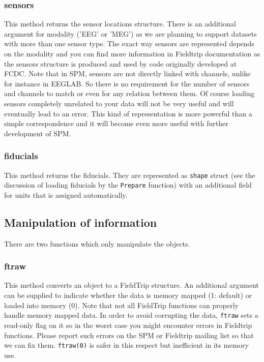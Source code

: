 \subsubsection{sensors}
This method returns the sensor locations structure. There is an additional argument for modality ('EEG' or 'MEG') as we are planning to support datasets with more than one sensor type. The exact way sensors are represented depends on the modality and you can find more information in Fieldtrip documentation as the sensors structure is produced and used by code originally developed at FCDC. Note that in SPM, sensors are not directly linked with channels, unlike for instance in EEGLAB. So there is no requirement for the number of sensors and channels to match or even for any relation between them. Of course loading sensors completely unrelated to your data will not be very useful and will eventually lead to an error. This kind of representation is more powerful than a simple correspondence and it will become even more useful with further development of SPM.

\subsubsection{fiducials}
This method returns the fiducials. They are represented as \texttt{shape} struct (see the discussion of loading fiducials by the \texttt{Prepare} function) with an additional field for units that is assigned automatically.

\subsection{Manipulation of information}
There are two functions which only manipulate the objects.

\subsubsection{ftraw}
This method converts an object to a FieldTrip structure. An additional argument can be supplied to indicate whether the data is memory mapped (1: default) or loaded into memory (0). Note that not all FieldTrip functions can properly handle memory mapped data. In order to avoid corrupting the data, \texttt{ftraw} sets a read-only flag on it so in the worst case you might encounter errors in Fieldtrip functions. Please report such errors on the SPM or Fieldtrip mailing list so that we can fix them. \texttt{ftraw(0)} is safer in this respect but inefficient in its memory use.

